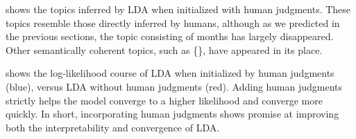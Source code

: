  shows the topics inferred by LDA when
initialized with human judgments.  These topics resemble those
directly inferred by humans, although as we predicted in the previous
sections, the topic consisting of months has largely disappeared.
Other semantically coherent topics, such as \{\}, have appeared in its place.

 shows the log-likelihood course of LDA when
initialized by human judgments (blue), versus LDA without human
judgments (red).  Adding human judgments strictly helps the model
converge to a higher likelihood and converge more quickly.  In short,
incorporating human judgments shows promise at improving both the
interpretability and convergence of LDA.

